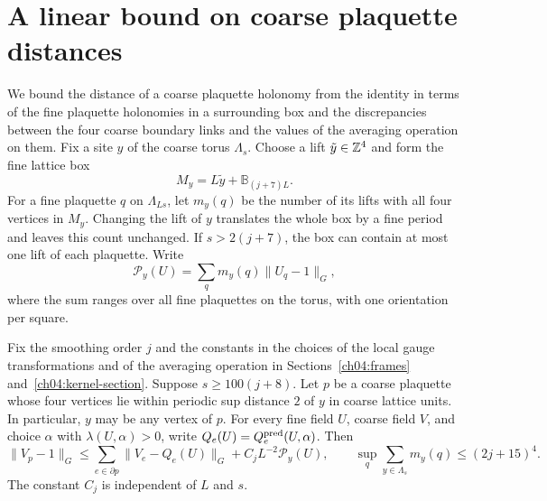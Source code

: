 \section{A linear bound on coarse plaquette distances}
\label{ch04:predictor-geometry}

We bound the distance of a coarse plaquette holonomy from the identity
in terms of the fine plaquette holonomies in a surrounding box and the
discrepancies between the four coarse boundary links and the values of
the averaging operation on them. Fix a site $y$ of the coarse torus
$\Lambda_s$. Choose a lift $\tilde y\in\mathbb Z^4$ and form the fine lattice box
\[
 M_y=L\tilde y+\mathbb B_{(j+7)L}.
\]
For a fine plaquette $q$ on $\Lambda_{Ls}$, let $m_y(q)$ be the number
of its lifts with all four vertices in $M_y$. Changing the lift of $y$
translates the whole box by a fine period and leaves this count unchanged.
If $s>2(j+7)$, the box can contain at most one lift of each plaquette. Write
\[
 \mathcal P_y(U)=\sum_{q}m_y(q)\|U_q-1\|_G,
\]
where the sum ranges over all fine plaquettes on the torus, with one
orientation per square.

\begin{lemma}
\label{ch04:predictor-comparison}
Fix the smoothing order $j$ and the constants in the choices of the local
gauge transformations and of the averaging operation in
Sections~\ref{ch04:frames} and~\ref{ch04:kernel-section}.
Suppose $s\ge100(j+8)$. Let $p$ be a coarse plaquette whose four
vertices lie within periodic sup distance $2$ of $y$ in coarse lattice
units. In particular, $y$ may be any vertex of $p$. For every fine field
$U$, coarse field $V$, and choice $\alpha$ with $\lambda(U,\alpha)>0$,
write $Q_e(U)=Q_e^{\rm pred}(U,\alpha)$. Then
\begin{equation}
 \|V_p-1\|_G\le\sum_{e\in\partial p}\|V_e-Q_e(U)\|_G
                         +C_jL^{-2}\mathcal P_y(U),
 \qquad \sup_q\sum_{y\in\Lambda_s}m_y(q)\le(2j+15)^4 .
 \label{ch04:macro-comparison}
\end{equation}
The constant $C_j$ is independent of $L$ and $s$.
\end{lemma}

